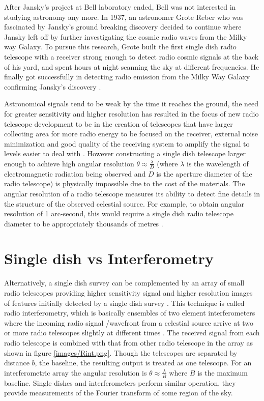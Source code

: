 After Jansky's project at Bell laboratory ended, Bell was not interested in studying astronomy any more. In 1937, an astronomer Grote Reber who was fascinated by Jansky's ground breaking discovery decided to continue where Jansky left off by further investigating the cosmic radio waves from the Milky way Galaxy. To pursue this research, Grote built the first single dish radio telescope with a receiver strong enough to detect radio cosmic signals at the back of his yard, and spent hours at night scanning the sky at different frequencies. He finally got successfully in detecting radio emission from the Milky Way Galaxy confirming Jansky's discovery \citep{verschuur2015invisible}.   

Astronomical signals tend to be weak by the time it reaches the ground, the need for greater sensitivity and higher resolution has resulted in the focus of new radio telescope development to be in the creation of telescopes that have larger collecting area for more radio energy to be focused on the receiver, external noise minimization and good quality of the receiving system to amplify the signal to levels easier to deal with \citep{verschuur2015invisible}. However constructing a single dish telescope larger enough to achieve high angular resolution $\theta \approx\frac{\lambda}{D}$ (where $\lambda$ is the wavelength of electromagnetic radiation  being observed and $D$ is the aperture diameter of the radio telescope) is physically impossible due to the cost of the materials. The angular resolution of a radio telescope measures its ability to detect fine details in the structure of the observed celestial source. For example, to obtain angular resolution of 1 arc-second, this would require a single dish radio telescope diameter to be appropriately thousands of metres \citep{verschuur2015invisible}. 

\section{Single dish vs Interferometry}
\label{RvI}
Alternatively, a single dish survey can be complemented by an array of small radio telescopes providing higher sensitivity signal and higher resolution images of features initially detected by a single dish survey \citep{wright2004single}. This technique is called radio interferometry, which is basically ensembles of two element interferometers where the incoming radio signal /wavefront from a celestial source arrive at two or more radio telescopes slightly at different times \citep{verschuur2015invisible}. The received signal from each radio telescope is combined with that from other radio telescope in the array as shown in figure \ref{images/Rint.png}. Though the telescopes are separated by distance $b$, the baseline, the resulting output is treated as one telescope. For an interferometric array the angular resolution is $\theta \approx\frac{\lambda}{B}$ where $B$ is the maximum baseline. Single dishes and interferometers  perform similar operation, they provide measurements of the Fourier transform of some region of the sky.

